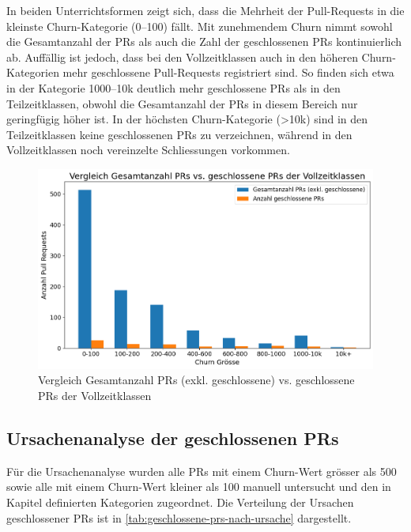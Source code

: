 In beiden Unterrichtsformen zeigt sich, dass die Mehrheit der Pull-Requests in die kleinste Churn-Kategorie (0–100) fällt. Mit zunehmendem Churn nimmt sowohl die Gesamtanzahl der PRs als auch die Zahl der geschlossenen PRs kontinuierlich ab. Auffällig ist jedoch, dass bei den Vollzeitklassen auch in den höheren Churn-Kategorien mehr geschlossene Pull-Requests registriert sind. So finden sich etwa in der Kategorie 1000–10k deutlich mehr geschlossene PRs als in den Teilzeitklassen, obwohl die Gesamtanzahl der PRs in diesem Bereich nur geringfügig höher ist.
In der höchsten Churn-Kategorie (>10k) sind in den Teilzeitklassen keine geschlossenen PRs zu verzeichnen, während in den Vollzeitklassen noch vereinzelte Schliessungen vorkommen. 

\begin{figure}[htbp]
    \includegraphics[width=\textwidth]{Figures/vergleich-gesamtanzahl-prs-vs-closed-vollzeit.png}
    \caption{Vergleich Gesamtanzahl PRs (exkl. geschlossene) vs. geschlossene PRs der Vollzeitklassen}
    \label{fig:vergleich-gesamtanzahl-prs-vs-closed-vollzeit}
\end{figure}

\newpage

\subsection{Ursachenanalyse der geschlossenen PRs}
Für die Ursachenanalyse wurden alle PRs mit einem Churn-Wert grösser als 500 sowie alle mit einem Churn-Wert kleiner als 100 manuell untersucht und den in Kapitel  definierten Kategorien zugeordnet. 
Die Verteilung der Ursachen geschlossener PRs ist in \autoref{tab:geschlossene-prs-nach-ursache} dargestellt. \\


